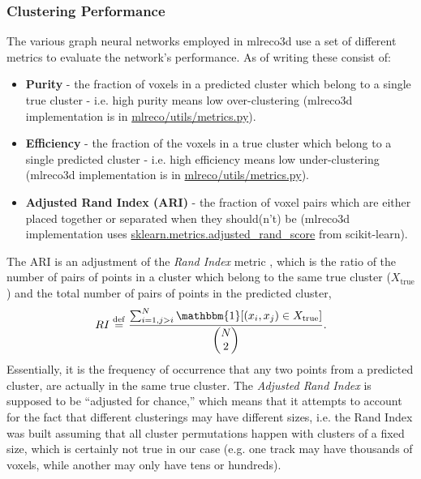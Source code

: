 \documentclass[8pt]{refart}
\begin{document}
\subsubsection{Clustering Performance}
The various graph neural networks employed in mlreco3d use a set of different metrics to evaluate the network's performance.  As of writing these consist of:
\begin{itemize}
    \item \textbf{Purity} - the fraction of voxels in a predicted cluster which belong to a single true cluster - i.e. high purity means low over-clustering (mlreco3d implementation is in \href{https://github.com/DeepLearnPhysics/lartpc_mlreco3d/blob/develop/mlreco/utils/metrics.py}{mlreco/utils/metrics.py}).
    \item \textbf{Efficiency} - the fraction of the voxels in a true cluster which belong to a single predicted cluster - i.e. high efficiency means low under-clustering (mlreco3d implementation is in \href{https://github.com/DeepLearnPhysics/lartpc_mlreco3d/blob/develop/mlreco/utils/metrics.py}{mlreco/utils/metrics.py}).
    \item \textbf{Adjusted Rand Index (ARI)} - the fraction of voxel pairs which are either placed together or separated when they should(n't) be (mlreco3d implementation uses \href{https://scikit-learn.org/stable/modules/generated/sklearn.metrics.adjusted_rand_score.html#sklearn.metrics.adjusted_rand_score}{sklearn.metrics.adjusted\_rand\_score} from scikit-learn).
\end{itemize}
The ARI is an adjustment of the \textit{Rand Index} metric \cite{Rand}, which is the ratio of the number of pairs of points in a cluster which belong to the same true cluster ($X_{\mathrm{true}}$) and the total number of pairs of points in the predicted cluster,
\begin{equation}
    RI \stackrel{\mathrm{def}}{=} \frac{\sum_{i=1,j > i}^N\mathbbm{1}[(x_i,x_j) \in X_{\mathrm{true}}]}{\begin{pmatrix}N\\2\end{pmatrix}}.
\end{equation}
Essentially, it is the frequency of occurrence that any two points from a predicted cluster, are actually in the same true cluster.  The \textit{Adjusted Rand Index} \cite{ARI1} is supposed to be ``adjusted for chance,'' which means that it attempts to account for the fact that different clusterings may have different sizes, i.e. the Rand Index was built assuming that all cluster permutations happen with clusters of a fixed size, which is certainly not true in our case (e.g. one track may have thousands of voxels, while another may only have tens or hundreds).
\end{document}
